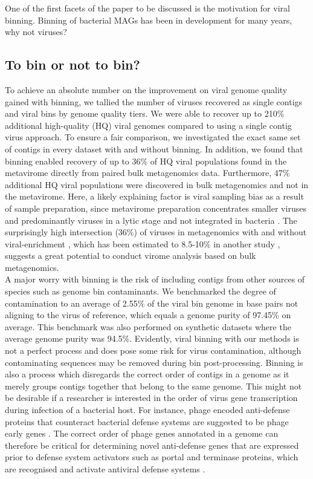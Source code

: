 \noindent
One of the first facets of the paper to be discussed is the motivation for viral binning. Binning of bacterial MAGs has been in development for many years, why not viruses?

\subsection{To bin or not to bin?}

To achieve an absolute number on the improvement on viral genome quality gained with binning, we tallied the number of viruses recovered as single contigs and viral bins by genome quality tiers. We were able to recover up to 210$\%$ additional high-quality (HQ) viral genomes compared to using a single contig virus approach. To ensure a fair comparison, we investigated the exact same set of contigs in every dataset with and without binning. In addition, we found that binning enabled recovery of up to 36$\%$ of HQ viral populations found in the metavirome directly from paired bulk metagenomics data. Furthermore, 47$\%$ additional HQ viral populations were discovered in bulk metagenomics and not in the metavirome. Here, a likely explaining factor is viral sampling bias as a result of sample preparation, since metavirome preparation concentrates smaller viruses and predominantly viruses in a lytic stage and not integrated in bacteria \cite{Roux2019-dc}. The surprisingly high intersection (36$\%$) of viruses in metagenomics with and without viral-enrichment , which has been estimated to 8.5-10$\%$ in another study \cite{Gregory2020-gu}, suggests a great potential to conduct virome analysis based on bulk metagenomics.\\

\noindent
A major worry with binning is the risk of including contigs from other sources of species such as genome bin contaminants. We benchmarked the degree of contamination to an average of 2.55$\%$ of the viral bin genome in base pairs not aligning to the virus of reference, which equals a genome purity of 97.45$\%$ on average. This benchmark was also performed on synthetic datasets where the average genome purity was 94.5$\%$. Evidently, viral binning with our methods is not a perfect process and does pose some risk for virus contamination, although contaminating sequences may be removed during bin post-processing. Binning is also a process which disregards the correct order of contigs in a genome as it merely groups contigs together that belong to the same genome. This might not be desirable if a researcher is interested in the order of virus gene transcription during infection of a bacterial host. For instance, phage encoded anti-defense proteins that counteract bacterial defense systems are suggested to be phage early genes \cite{Gao2022-ux}. The correct order of phage genes annotated in a genome can therefore be critical for determining novel anti-defense genes that are expressed prior to defense system activators such as portal and terminase proteins, which are recognised and activate antiviral defense systems \cite{Gao2022-ux}.\\ 

